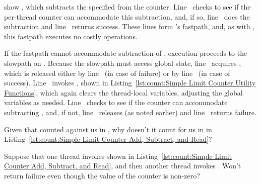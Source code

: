 \begin{lineref}
 show ,
which subtracts the specified
 from the counter.
Line~ checks to see if the per-thread counter can accommodate
this subtraction, and, if so, line~ does the subtraction and
line~ returns success.
These lines form 's fastpath, and, as with
, this fastpath executes no costly operations.

If the fastpath cannot accommodate subtraction of ,
execution proceeds to the slowpath on
.
Because the slowpath must access global state, line~
acquires , which is released either by line~
(in case of failure) or by line~ (in case of success).
Line~ invokes , shown in
Listing~\ref{lst:count:Simple Limit Counter Utility Functions},
which again clears the thread-local variables, adjusting the global variables
as needed.
Line~ checks to see if the counter can accommodate subtracting
, and, if not, line~ releases 
(as noted earlier) and line~ returns failure.
\end{lineref}

\QuickQuiz{}
	Given that  counted against us in ,
	why doesn't it count for us in  in
	Listing~\ref{lst:count:Simple Limit Counter Add, Subtract, and Read}?
 \QuickQuizEnd

\QuickQuiz{}
	Suppose that one thread invokes  shown in
	Listing~\ref{lst:count:Simple Limit Counter Add, Subtract, and Read},
	and then another thread invokes .
	Won't  return failure even though the value of
	the counter is non-zero?
 \QuickQuizEnd


